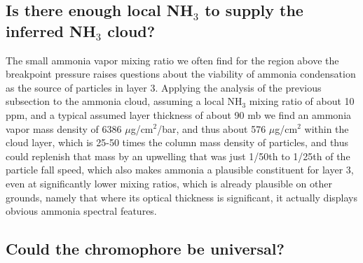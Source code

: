 \documentclass[article,11pt]{emulateapj}
\def\nht{NH$_3$ }
\begin{document}
\subsection{Is there enough local \nht to supply the inferred \nht cloud?}

The small ammonia vapor mixing ratio we often find for the region above
the breakpoint pressure raises questions about the viability of
ammonia condensation as the source of particles in layer 3.  Applying
the analysis of the previous subsection to the ammonia cloud, assuming
a local \nht mixing ratio of about 10 ppm, and a typical assumed layer
thickness of about 90 mb we find an ammonia vapor mass density of 6386
$\mu$g/cm$^2$/bar, and thus about 576 $\mu$g/cm$^2$ within the cloud
layer, which is 25-50 times the column mass density of particles, and
thus could replenish that mass by an upwelling that was just 1/50th to
1/25th of the particle fall speed, which also makes ammonia a plausible
constituent for layer 3, even at significantly lower
mixing ratios, which is already plausible on other
grounds, namely that where its optical thickness is significant,
it actually displays obvious ammonia spectral
features.

\subsection{Could the chromophore be universal?}
\end{document}
